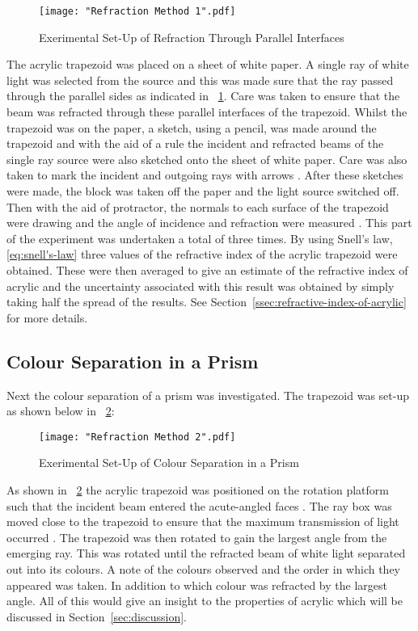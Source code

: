 \documentclass{article}
\newcommand{\figref}[2][\figurename~]{#1\ref{#2}}
\newcommand{\secref}[2][Section~]{#1\ref{#2}}
\begin{document}
\begin{figure}[h]
\centering
\texttt{[image: "Refraction Method 1".pdf]}
\caption{Exerimental Set-Up of Refraction Through Parallel Interfaces}
\label{fig:method1}
\end{figure}

\noindent
The acrylic trapezoid was placed on a sheet of white paper. A single ray of white light was selected from the source and this was made sure that the ray passed through the parallel sides \cite{Paper01} as indicated in \figref{fig:method1}. Care was taken to ensure that the beam was refracted through these parallel interfaces of the trapezoid. Whilst the trapezoid was on the paper, a sketch, using a pencil, was made around the trapezoid and with the aid of a rule the incident and refracted beams of the single ray source were also sketched onto the sheet of white paper. Care was also taken to mark the incident and outgoing rays with arrows \cite{Paper01}. After these sketches were made, the block was taken off the paper and the light source switched off. Then with the aid of protractor, the normals to each surface of the trapezoid were drawing and the angle of incidence and refraction were measured \cite{Paper01}. This part of the experiment was undertaken a total of three times. By using Snell's law, \eqref{eq:snell's-law} three values of the refractive index of the acrylic trapezoid were obtained. These were then averaged to give an estimate of the refractive index of acrylic \cite{Paper01} and the uncertainty associated with this result was obtained by simply taking half the spread of the results. See \secref{ssec:refractive-index-of-acrylic} for more details.

\subsection{Colour Separation in a Prism}
\label{ssec:colour-separation}

Next the colour separation of a prism was investigated. The trapezoid was set-up as shown below in \figref{fig:method2}:

\begin{figure}[h]
\centering
\texttt{[image: "Refraction Method 2".pdf]}
\caption{Exerimental Set-Up of Colour Separation in a Prism}
\label{fig:method2}
\end{figure}

\vspace{10mm}
\noindent
As shown in \figref{fig:method2} the acrylic trapezoid was positioned on the rotation platform such that the incident beam entered the acute-angled faces \cite{Paper01}. The ray box was moved close to the trapezoid to ensure that the maximum transmission of light occurred \cite{Paper01}. The trapezoid was then rotated to gain the largest angle from the emerging ray. This was rotated until the refracted beam of white light separated out into its colours. A note of the colours observed and the order in which they appeared was taken. In addition to which colour was refracted by the largest angle. All of this would give an insight to the properties of acrylic which will be discussed in \secref{sec:discussion}. 
\end{document}
